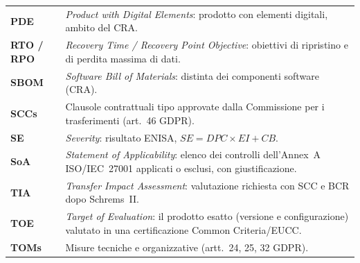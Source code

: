\begin{longtable}{>{\bfseries}p{}p{}}
PDE & \emph{Product with Digital Elements}: prodotto con elementi digitali, ambito del CRA. \\
RTO / RPO & \emph{Recovery Time / Recovery Point Objective}: obiettivi di ripristino e di perdita
  massima di dati. \\
SBOM & \emph{Software Bill of Materials}: distinta dei componenti software (CRA). \\
SCCs & Clausole contrattuali tipo approvate dalla Commissione per i trasferimenti (art.~46 GDPR). \\
SE & \emph{Severity}: risultato ENISA, $SE = DPC \times EI + CB$. \\
SoA & \emph{Statement of Applicability}: elenco dei controlli dell'Annex~A ISO/IEC~27001 applicati
  o esclusi, con giustificazione. \\
TIA & \emph{Transfer Impact Assessment}: valutazione richiesta con SCC e BCR dopo Schrems~II. \\
TOE & \emph{Target of Evaluation}: il prodotto esatto (versione e configurazione) valutato in una
  certificazione Common Criteria/EUCC. \\
TOMs & Misure tecniche e organizzative (artt.~24, 25, 32 GDPR). \\
\bottomrule
\end{longtable}

